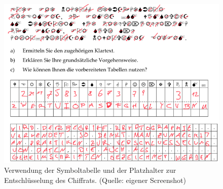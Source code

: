 \begin{figure}
    \centering
    \includegraphics[scale=0.5]{aufgabe 1/img/decode}
    \caption{Verwendung der Symboltabelle und der Platzhalter zur Entschlüsselung des Chiffrats. (Quelle: eigener Screenshot)}
    \label{fig:decode}
\end{figure}





